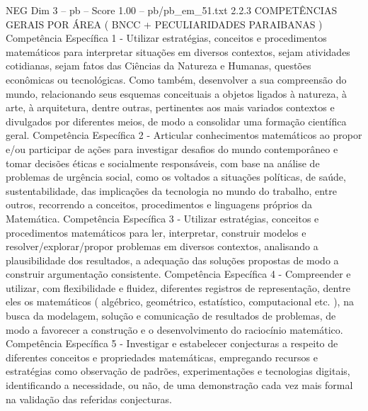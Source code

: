 \begin{textsample}{NEG Dim 3 – pb – Score 1.00 – pb/pb\_em\_51.txt}  \label{ex:f3_neg_208}
2.2.3 COMPETÊNCIAS GERAIS POR ÁREA ( BNCC + PECULIARIDADES PARAIBANAS ) Competência Específica 1 - Utilizar estratégias, conceitos e procedimentos matemáticos para interpretar situações em diversos contextos, sejam atividades cotidianas, sejam fatos das Ciências da Natureza e Humanas, questões econômicas ou tecnológicas.
Como também, desenvolver a sua compreensão do mundo, relacionando seus esquemas conceituais a objetos ligados à natureza, à arte, à arquitetura, dentre outras, pertinentes aos mais variados contextos e divulgados por diferentes meios, de modo a consolidar uma formação científica geral.
Competência Específica 2 - Articular conhecimentos matemáticos ao propor e/ou participar de ações para investigar desafios do mundo contemporâneo e tomar decisões éticas e socialmente responsáveis, com base na análise de problemas de urgência social, como os voltados a situações políticas, de saúde, sustentabilidade, das implicações da tecnologia no mundo do trabalho, entre outros, recorrendo a conceitos, procedimentos e linguagens próprios da Matemática.
Competência Específica 3 - Utilizar estratégias, conceitos e procedimentos matemáticos para ler, interpretar, construir modelos e resolver/explorar/propor problemas em diversos contextos, analisando a plausibilidade dos resultados, a adequação das soluções propostas de modo a construir argumentação consistente.
Competência Específica 4 - Compreender e utilizar, com flexibilidade e fluidez, diferentes registros de representação, dentre eles os matemáticos ( algébrico, geométrico, estatístico, computacional etc. ), na busca da modelagem, solução e comunicação de resultados de problemas, de modo a favorecer a construção e o desenvolvimento do raciocínio matemático.
Competência Específica 5 - Investigar e estabelecer conjecturas a respeito de diferentes conceitos e propriedades matemáticas, empregando recursos e estratégias como observação de padrões, experimentações e tecnologias digitais, identificando a necessidade, ou não, de uma demonstração cada vez mais formal na validação das referidas conjecturas.

\end{textsample}
